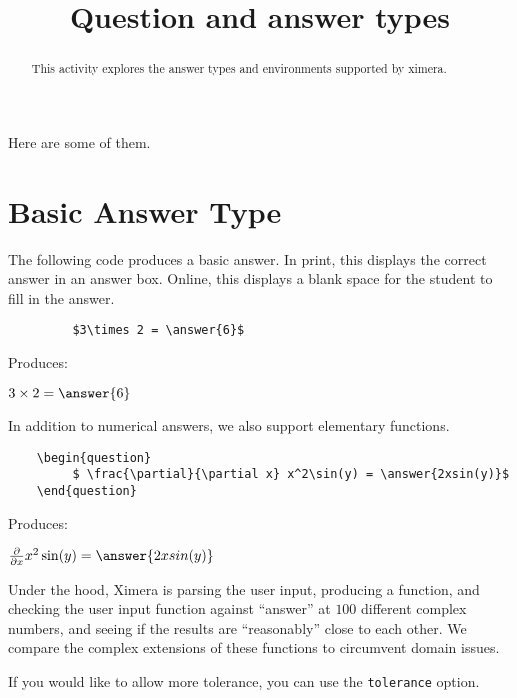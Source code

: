\documentclass{ximera}
\title{Question and answer types}
\begin{document}
\begin{abstract}
  This activity explores the answer types and environments supported by ximera.
\end{abstract}

\maketitle

Here are some of them.

\section{Basic Answer Type}

The following code produces a basic answer. In print, this displays the correct answer in an answer box. Online, this displays a blank space for the student to fill in the answer. 

\begin{verbatim}
         $3\times 2 = \answer{6}$
\end{verbatim}

Produces:

\begin{question}
  $3\times 2 = \answer{6}$
\end{question}

In addition to numerical answers, we also support elementary functions.

\begin{verbatim}
    \begin{question}
         $ \frac{\partial}{\partial x} x^2\sin(y) = \answer{2xsin(y)}$
    \end{question}
\end{verbatim}

Produces:

\begin{question}
  $ \frac{\partial}{\partial x} x^2\sin(y) = \answer{2xsin(y)}$
\end{question}

\begin{remark}
Under the hood, Ximera is parsing the user input, producing a
function, and checking the user input function against ``answer'' at
$100$ different complex numbers, and seeing if the results are
``reasonably'' close to each other.  We compare the complex extensions
of these functions to circumvent domain issues.
\end{remark}

If you would like to allow more tolerance, you can use the \verb!tolerance! option. 
\end{document}
